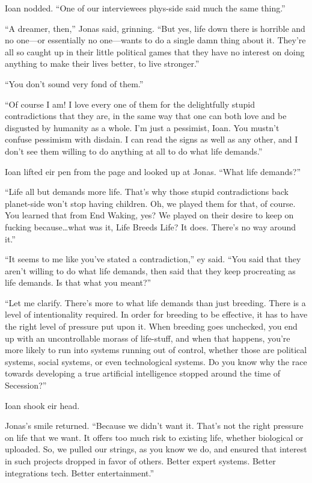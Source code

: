 Ioan nodded. ``One of our interviewees phys-side said much the same thing.''

``A dreamer, then,'' Jonas said, grinning. ``But yes, life down there is horrible and no one---or essentially no one---wants to do a single damn thing about it. They're all so caught up in their little political games that they have no interest on doing anything to make their lives better, to live stronger.''

``You don't sound very fond of them.''

``Of course I am! I love every one of them for the delightfully stupid contradictions that they are, in the same way that one can both love and be disgusted by humanity as a whole. I'm just a pessimist, Ioan. You mustn't confuse pessimism with disdain. I can read the signs as well as any other, and I don't see them willing to do anything at all to do what life demands.''

Ioan lifted eir pen from the page and looked up at Jonas. ``What life demands?''

``Life all but demands more life. That's why those stupid contradictions back planet-side won't stop having children. Oh, we played them for that, of course. You learned that from End Waking, yes? We played on their desire to keep on fucking because\ldots what was it, Life Breeds Life? It does. There's no way around it.''

``It seems to me like you've stated a contradiction,'' ey said. ``You said that they aren't willing to do what life demands, then said that they keep procreating as life demands. Is that what you meant?''

``Let me clarify. There's more to what life demands than just breeding. There is a level of intentionality required. In order for breeding to be effective, it has to have the right level of pressure put upon it. When breeding goes unchecked, you end up with an uncontrollable morass of life-stuff, and when that happens, you're more likely to run into systems running out of control, whether those are political systems, social systems, or even technological systems. Do you know why the race towards developing a true artificial intelligence stopped around the time of Secession?''

Ioan shook eir head.

Jonas's smile returned. ``Because we didn't want it. That's not the right pressure on life that we want. It offers too much risk to existing life, whether biological or uploaded. So, we pulled our strings, as you know we do, and ensured that interest in such projects dropped in favor of others. Better expert systems. Better integrations tech. Better entertainment.''

